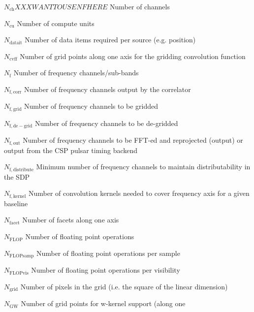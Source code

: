 \documentclass[11pt,a4paper]{article}
\newcommand{\nch}{N_\mathrm{ch}XXXWANT TO USE NF HERE} %
\newcommand{\ncompu}{N_\mathrm{cu}} %
\newcommand{\ndatait}{N_\mathrm{datait}} %
\newcommand{\ngridp}{N_\mathrm{cvff}} %
\newcommand{\nfch}{N_\mathrm{f}} %
\newcommand{\nfchcorr}{N_\mathrm{f,corr}} %
\newcommand{\nfchgrid}{N_\mathrm{f,grid}} %
\newcommand{\nfchdegrid}{N_\mathrm{f,de-grid}} %
\newcommand{\nfchout}{N_\mathrm{f,out}} %
\newcommand{\nfchdist}{N_\mathrm{f,distribute}} %
\newcommand{\nfkernel}{N_\mathrm{f,kernel}} %
\newcommand{\nfacet}{N_\mathrm{facet}} %
\newcommand{\nflop}{N_\mathrm{FLOP}} %
\newcommand{\nflopsamp}{N_\mathrm{FLOPsamp}} %
\newcommand{\nflopvis}{N_\mathrm{FLOPvis}} %
\newcommand{\npixgrid}{N_\mathrm{grid}} %
\newcommand{\ngridwkern}{N_\mathrm{GW}} %
\begin{document}
\begin{basedescript}{\desclabelstyle{\pushlabel}\desclabelwidth{6em}}
\item[$\nch$] Number of channels \vspace{-0.2cm}
\item[$\ncompu$] Number of compute units \vspace{-0.2cm}
\item[$\ndatait$] Number of data items required per source (e.g. position)\vspace{-0.2cm}
\item[$\ngridp$] Number of grid points along one axis for the gridding
  convolution function \vspace{-0.2cm}
\item[$\nfch$] Number of frequency channels/sub-bands \vspace{-0.2cm}
\item[$\nfchcorr$] Number of frequency channels output by the correlator
  \vspace{-0.2cm}
\item[$\nfchgrid$] Number of frequency channels to be gridded
  \vspace{-0.2cm}
\item[$\nfchdegrid$] Number of frequency channels to be de-gridded
  \vspace{-0.2cm}
\item[$\nfchout$] Number of frequency channels to be FFT-ed and reprojected
  (output) or output from the CSP pulsar timing backend\vspace{-0.2cm}
\item[$\nfchdist$] Minimum number of frequency channels to maintain distributability in the SDP
\item[$\nfkernel$] Number of convolution kernels needed to cover frequency axis for a given baseline
\item[$\nfacet$] Number of facets along one axis \vspace{-0.2cm}
\item[$\nflop$] Number of floating point operations
  \vspace{-0.2cm}
\item[$\nflopsamp$] Number of floating point operations per sample
  \vspace{-0.2cm}
\item[$\nflopvis$] Number of floating point operations per visibility
\item[$\npixgrid$] Number of pixels in the grid (i.e. the square of the linear
  dimension) \vspace{-0.2cm}
\item[$\ngridwkern$] Number of grid points for w-kernel support (along one

\end{basedescript}
\end{document}
